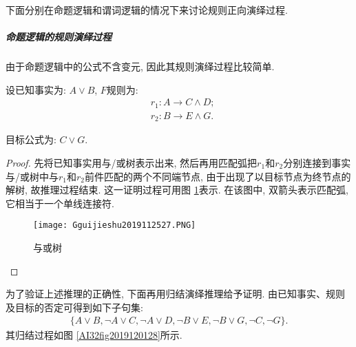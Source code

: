 下面分别在命题逻辑和谓词逻辑的情况下来讨论规则正向演绎过程.
\subparagraph{命题逻辑的规则演绎过程}
    由于命题逻辑中的公式不含变元, 因此其规则演绎过程比较简单.
\begin{example}
    设已知事实为: $A\vee B$, $F$规则为:
\begin{align}
    &r_1:  A\rightarrow C\wedge D;\\
    &r_2:  B\rightarrow E\wedge G.
\end{align}

目标公式为: $C\vee G$.
\end{example}
\begin{proof}
    先将已知事实用与/或树表示出来, 然后再用匹配弧把$r_1$和$r_2$分别连接到事实与/或树中与$r_1$和$r_2$前件匹配的两个不同端节点, 由于出现了以目标节点为终节点的解树, 故推理过程结束. 这一证明过程可用图 \ref{AI32fig2019120127}表示.
在该图中, 双箭头表示匹配弧, 它相当于一个单线连接符.
\begin{figure}[H]
    \centering
    \texttt{[image: Gguijieshu2019112527.PNG]}
    \caption{与或树}
    \label{AI32fig2019120127}
\end{figure}
\end{proof}
为了验证上述推理的正确性, 下面再用归结演绎推理给予证明. 由已知事实、规则及目标的否定可得到如下子句集:
\begin{align}
    \{A\vee B, \neg A\vee C, \neg A\vee D, \neg B\vee E, \neg B\vee G, \neg C, \neg G\}.
\end{align}
其归结过程如图 \ref{AI32fig2019120128}所示.
